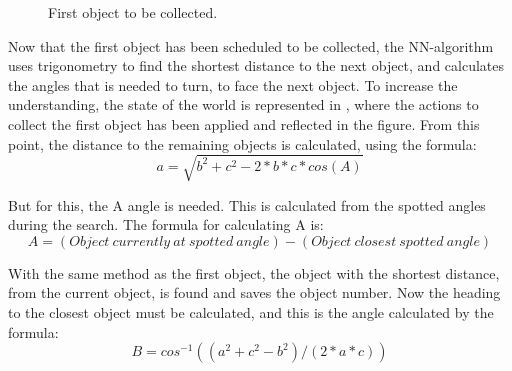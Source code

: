 \begin{figure}[H]
     \caption{\label{fig:object_navigation_first} First object to be collected.}
\end{figure}

Now that the first object has been scheduled to be collected, the NN-algorithm uses trigonometry to find the shortest distance to the next object, and calculates the angles that is needed to turn, to face the next object. To increase the understanding, the state of the world is represented in , where the actions to collect the first object has been applied and reflected in the figure. From this point, the distance to the remaining objects is calculated, using the formula:
\begin{equation}
a = \sqrt{ b^2 + c^2 - 2*b*c*cos(A) } \label{equation:a}
\end{equation}

But for this, the A angle is needed. This is calculated from the spotted angles during the search. The formula for calculating A is:
\begin{equation}
A = (Object~currently~at~spotted~angle) - (Object~closest~spotted~angle) \label{equation:AAngle}
\end{equation}

With the same method as the first object, the object with the shortest distance, from the current object, is found and saves the object number. Now the heading to the closest object must be calculated, and this is the angle calculated by the formula:
\begin{equation}
B = cos^{-1}((a^2 + c^2 - b^2)/(2*a*c)) \label{equation:B}
\end{equation}

